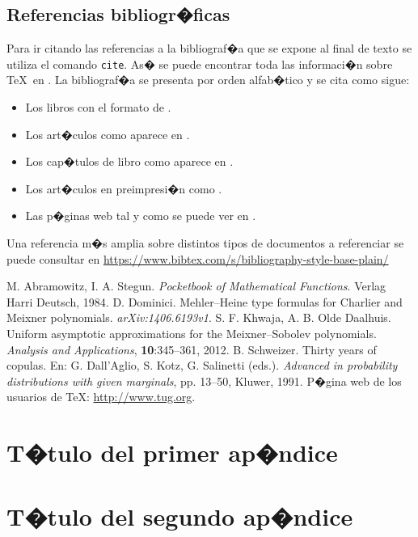 \documentclass[a4paper,12pt,%
]{memoir}
\begin{document}
\section{Referencias bibliogr�ficas}
Para ir citando las referencias a la bibliograf�a que se expone al
final de texto se utiliza el comando \texttt{cite}. As� se puede
encontrar toda las informaci�n sobre \TeX\ en \cite{tex}. La
bibliograf�a se presenta por orden alfab�tico y se cita como sigue:
\begin{itemize}
\item Los libros con el formato de \cite{abrste}.
\item Los art�culos como aparece en \cite{khwdaa}.
\item Los cap�tulos de libro como aparece en \cite{schwe}.
\item Los art�culos en preimpresi�n como \cite{dom}.
\item Las p�ginas web tal y como se puede ver en \cite{tex}. 
\end{itemize}
\par
Una referencia m�s amplia sobre distintos tipos de documentos a
referenciar se puede consultar en
\url{https://www.bibtex.com/s/bibliography-style-base-plain/}

\begin{thebibliography}{99}
 M. Abramowitz, I. A. Stegun. \textit{Pocketbook of
    Mathematical Functions}. Verlag Harri Deutsch, 1984.
 D. Dominici. Mehler--Heine type formulas for
    Charlier and Meixner polynomials. \textit{arXiv:1406.6193v1}.
 S. F. Khwaja, A. B. Olde Daalhuis. Uniform
    asymptotic approximations for the Meixner--Sobolev polynomials.
    \textit{Analysis and Applications}, \textbf{10}:345--361, 2012.
   B. Schweizer. Thirty years of copulas. En:
    G. Dall{'}Aglio, S. Kotz, G. Salinetti (eds.). \textit{Advanced in
    probability distributions with given marginals}, pp. 13--50,
    Kluwer, 1991.
 P�gina web de los usuarios de \TeX: \url{http://www.tug.org}.
\end{thebibliography}

\appendix
\appendixpage

\chapter{T�tulo del primer ap�ndice}
\lipsum
\chapter{T�tulo del segundo ap�ndice}
\lipsum
\end{document}
